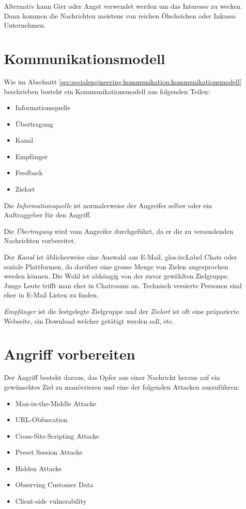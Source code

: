 Alternativ kann Gier oder Angst verwendet werden um das Interesse zu wecken. Dann kommen die Nachrichten meistens von reichen Ölscheichen oder Inkasso Unternehmen.

\section{Kommunikationsmodell}
Wie im Abschnitt \ref{sec:socialengineering:kommunikation:kommunikationsmodell} beschrieben besteht ein Kommunikationsmodell aus folgenden Teilen:
\begin{itemize}
\item Informationsquelle
\item Übertragung
\item Kanal
\item Empfänger
\item Feedback
\item Zielort
\end{itemize}

Die \textit{Informationsquelle} ist normalerweise der Angreifer selber oder ein Auftraggeber für den Angriff.

Die \textit{Übertragung} wird vom Angreifer durchgeführt, da er die zu versendenden Nachrichten vorbereitet.

Der \textit{Kanal} ist üblicherweise eine Auswahl aus E-Mail,  \Gls{glos:ircLabel} Chats oder soziale Plattformen, da darüber eine grosse Menge von Zielen angesprochen werden können. Die Wahl ist abhängig von der zuvor gewählten Zielgruppe. Junge Leute trifft man eher in Chatrooms an. Technisch versierte Personen sind eher in E-Mail Listen zu finden.

\textit{Empfänger} ist die festgelegte Zielgruppe und der \textit{Zielort} ist oft eine präparierte Webseite, ein Download welcher getätigt werden soll, etc.

\section{Angriff vorbereiten}
Der Angriff besteht daraus, das Opfer aus einer Nachricht heraus auf ein gewünschtes Ziel zu manövrieren und eine der folgenden Attacken auszuführen:
\begin{itemize}
\item Man-in-the-Middle Attacke
\item URL-Obfuscation
\item Cross-Site-Scripting Attacke
\item Preset Session Attacke
\item Hidden Attacke
\item Observing Customer Data
\item Client-side vulnerability
\end{itemize}

